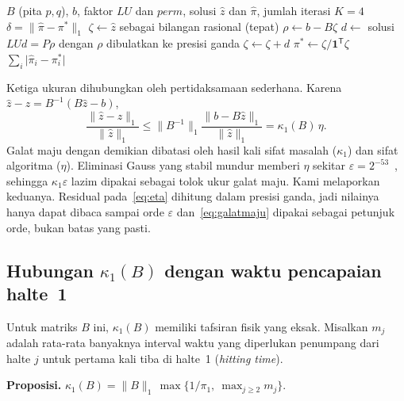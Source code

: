 \documentclass[12pt,a4paper]{article}
\newcommand{\T}{\mathsf{T}}
\numberwithin{equation}{section}
\begin{document}
\begin{algorithm}[H]
\caption{Solusi acuan $\pi^\ast$ dan galat maju $\delta$ dengan perbaikan iteratif dan residual eksak}
\label{alg:acuan}
\begin{algorithmic}[1]
\Require $B$ (pita $p,q$), $b$, faktor $LU$ dan $\mathit{perm}$, solusi $\hat z$ dan $\hat\pi$, jumlah iterasi $K=4$
\Ensure $\delta=\lVert\hat\pi-\pi^\ast\rVert_1$
\State $\zeta\gets\hat z$ sebagai bilangan rasional (tepat)
  \State $\rho\gets b-B\zeta$ 
  \State $d\gets$ solusi $LUd=P\rho$ dengan $\rho$ dibulatkan ke presisi ganda 
  \State $\zeta\gets\zeta+d$ 
\EndFor
\State $\pi^\ast\gets\zeta/\mathbf1^\T\zeta$ 
\State \Return $\sum_i\lvert\hat\pi_i-\pi^\ast_i\rvert$ 
\end{algorithmic}
\end{algorithm}

Ketiga ukuran dihubungkan oleh pertidaksamaan sederhana. Karena $\hat z-z=B^{-1}(B\hat z-b)$,
\begin{equation}\label{eq:galatmaju}
\frac{\lVert\hat z-z\rVert_1}{\lVert\hat z\rVert_1}
\le\lVert B^{-1}\rVert_1\frac{\lVert b-B\hat z\rVert_1}{\lVert\hat z\rVert_1}
=\kappa_1(B)\,\eta .
\end{equation}
Galat maju dengan demikian dibatasi oleh hasil kali sifat masalah ($\kappa_1$) dan sifat algoritma ($\eta$). Eliminasi
Gauss yang stabil mundur memberi $\eta$ sekitar $\varepsilon=2^{-53}$~\cite{higham}, sehingga $\kappa_1\varepsilon$
lazim dipakai sebagai tolok ukur galat maju. Kami melaporkan keduanya. Residual pada~\eqref{eq:eta} dihitung dalam presisi
ganda, jadi nilainya hanya dapat dibaca sampai orde $\varepsilon$ dan~\eqref{eq:galatmaju} dipakai sebagai petunjuk orde,
bukan batas yang pasti.

\subsection{Hubungan $\kappa_1(B)$ dengan waktu pencapaian halte~1}
Untuk matriks $B$ ini, $\kappa_1(B)$ memiliki tafsiran fisik yang eksak. Misalkan $m_j$ adalah rata-rata banyaknya
interval waktu yang diperlukan penumpang dari halte $j$ untuk pertama kali tiba di halte~1 (\emph{hitting time}).

\medskip\noindent\textbf{Proposisi.}
$\kappa_1(B)=\lVert B\rVert_1\,\max\bigl\{1/\pi_1,\ \max_{j\ge2}m_j\bigr\}$.
\end{document}
